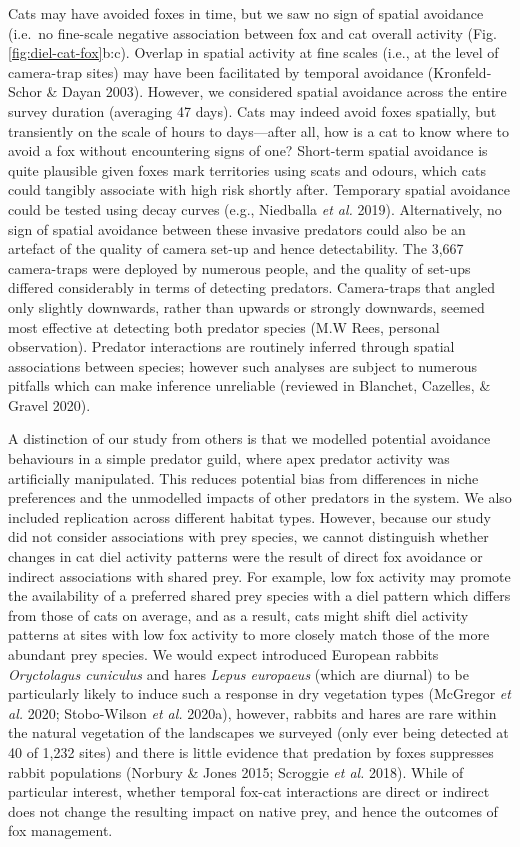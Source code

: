 \documentclass[11pt,a4paper,titlepage,twoside,openright]{style/unimelbthesis}
\begin{document}
\begin{mainmatter}
Cats may have avoided foxes in time, but we saw no sign of spatial avoidance (i.e.~no fine-scale negative association between fox and cat overall activity (Fig. \ref{fig:diel-cat-fox}b:c). Overlap in spatial activity at fine scales (i.e., at the level of camera-trap sites) may have been facilitated by temporal avoidance (Kronfeld-Schor \& Dayan 2003). However, we considered spatial avoidance across the entire survey duration (averaging 47 days). Cats may indeed avoid foxes spatially, but transiently on the scale of hours to days---after all, how is a cat to know where to avoid a fox without encountering signs of one? Short-term spatial avoidance is quite plausible given foxes mark territories using scats and odours, which cats could tangibly associate with high risk shortly after. Temporary spatial avoidance could be tested using decay curves (e.g., Niedballa \emph{et al.} 2019). Alternatively, no sign of spatial avoidance between these invasive predators could also be an artefact of the quality of camera set-up and hence detectability. The 3,667 camera-traps were deployed by numerous people, and the quality of set-ups differed considerably in terms of detecting predators. Camera-traps that angled only slightly downwards, rather than upwards or strongly downwards, seemed most effective at detecting both predator species (M.W Rees, personal observation). Predator interactions are routinely inferred through spatial associations between species; however such analyses are subject to numerous pitfalls which can make inference unreliable (reviewed in Blanchet, Cazelles, \& Gravel 2020).

A distinction of our study from others is that we modelled potential avoidance behaviours in a simple predator guild, where apex predator activity was artificially manipulated. This reduces potential bias from differences in niche preferences and the unmodelled impacts of other predators in the system. We also included replication across different habitat types. However, because our study did not consider associations with prey species, we cannot distinguish whether changes in cat diel activity patterns were the result of direct fox avoidance or indirect associations with shared prey. For example, low fox activity may promote the availability of a preferred shared prey species with a diel pattern which differs from those of cats on average, and as a result, cats might shift diel activity patterns at sites with low fox activity to more closely match those of the more abundant prey species. We would expect introduced European rabbits \emph{Oryctolagus cuniculus} and hares \emph{Lepus europaeus} (which are diurnal) to be particularly likely to induce such a response in dry vegetation types (McGregor \emph{et al.} 2020; Stobo-Wilson \emph{et al.} 2020a), however, rabbits and hares are rare within the natural vegetation of the landscapes we surveyed (only ever being detected at 40 of 1,232 sites) and there is little evidence that predation by foxes suppresses rabbit populations (Norbury \& Jones 2015; Scroggie \emph{et al.} 2018). While of particular interest, whether temporal fox-cat interactions are direct or indirect does not change the resulting impact on native prey, and hence the outcomes of fox management.


\end{mainmatter}
\end{document}
